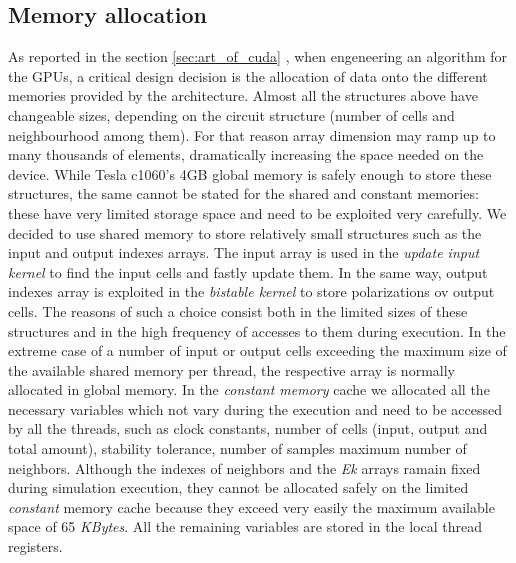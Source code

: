 \subsection{Memory allocation}
As reported in the section \ref{sec:art_of_cuda} , when engeneering an algorithm for the GPUs, a critical
design decision is the allocation of data onto the different memories provided by the architecture.
Almost all the structures above have changeable sizes, depending on the circuit structure (number of cells and neighbourhood among them).
For that reason array dimension may ramp up to many thousands of elements, dramatically increasing the space needed on the device.
While Tesla c1060's 4GB global memory is safely enough to store these structures, the same cannot be stated for the shared and constant
memories: these have very limited storage space and need to be exploited very carefully.
We decided to use shared memory to store relatively small structures such as the input and output indexes arrays. The input array is used
in the \textit{update input kernel} to find the input cells and fastly update them. In the same way, output indexes array is exploited 
in the \textit{bistable kernel} to store polarizations ov output cells.\newline
The reasons of such a choice consist both in the limited sizes of these structures and in the high frequency of accesses to them during
execution. In the extreme case of a number of input or output cells exceeding the maximum size of the available shared memory per thread, 
the respective array is normally allocated in global memory.\newline
In the \textit{constant memory} cache we allocated all the necessary variables which not vary during the execution and need to be accessed
by all the threads, such as clock constants, number of cells (input, output and total amount), stability tolerance, number of samples 
 maximum number of neighbors. Although the indexes of neighbors  and the \textit{Ek} arrays ramain fixed during simulation execution, they 
cannot be allocated safely on the limited \textit{constant} memory cache because they exceed very easily the maximum available space of
65 \textit{KBytes}. All the remaining variables are stored in the local thread registers.\newline

